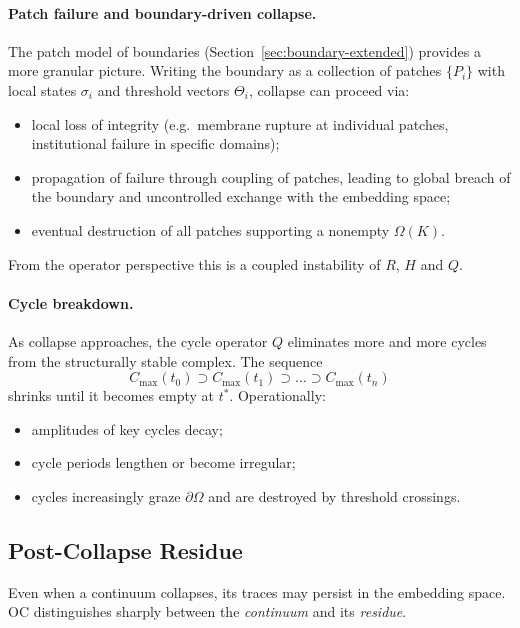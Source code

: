 \paragraph{Patch failure and boundary-driven collapse.}
The patch model of boundaries
(Section~\ref{sec:boundary-extended}) provides a more granular picture.
Writing the boundary as a collection of patches \(\{P_i\}\) with local states
\(\sigma_i\) and threshold vectors \(\Theta_i\),
collapse can proceed via:
\begin{itemize}
  \item local loss of integrity (e.g.\ membrane rupture at individual
        patches, institutional failure in specific domains);
  \item propagation of failure through coupling of patches, leading to
        global breach of the boundary and uncontrolled exchange with the
        embedding space;
  \item eventual destruction of all patches supporting a nonempty
        \(\Omega(K)\).
\end{itemize}
From the operator perspective this is a coupled instability of \(R\),
\(H\) and \(Q\).

\paragraph{Cycle breakdown.}
As collapse approaches, the cycle operator \(Q\) eliminates more and more
cycles from the structurally stable complex. The sequence
\[
  C_{\max}(t_0)
  \supset C_{\max}(t_1)
  \supset \dots
  \supset C_{\max}(t_n)
\]
shrinks until it becomes empty at \(t^{\ast}\). Operationally:
\begin{itemize}
  \item amplitudes of key cycles decay;
  \item cycle periods lengthen or become irregular;
  \item cycles increasingly graze \(\partial\Omega\) and are destroyed by
        threshold crossings.
\end{itemize}

\subsection{Post-Collapse Residue}

Even when a continuum collapses, its traces may persist in the embedding
space. OC distinguishes sharply between the \emph{continuum} and its
\emph{residue}.

